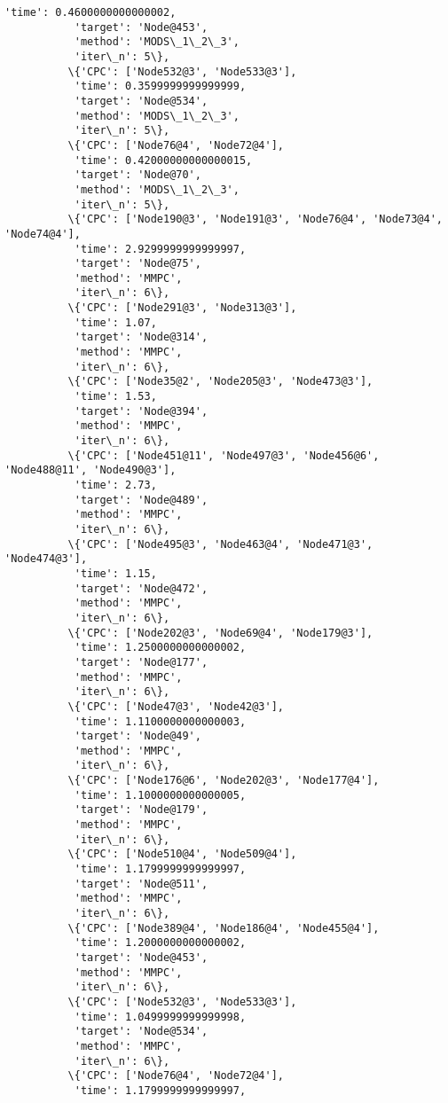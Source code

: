 \documentclass[11pt]{article}
\begin{document}
\begin{Verbatim}[commandchars=\\\{\}]
           'time': 0.4600000000000002,
           'target': 'Node@453',
           'method': 'MODS\_1\_2\_3',
           'iter\_n': 5\},
          \{'CPC': ['Node532@3', 'Node533@3'],
           'time': 0.3599999999999999,
           'target': 'Node@534',
           'method': 'MODS\_1\_2\_3',
           'iter\_n': 5\},
          \{'CPC': ['Node76@4', 'Node72@4'],
           'time': 0.42000000000000015,
           'target': 'Node@70',
           'method': 'MODS\_1\_2\_3',
           'iter\_n': 5\},
          \{'CPC': ['Node190@3', 'Node191@3', 'Node76@4', 'Node73@4', 'Node74@4'],
           'time': 2.9299999999999997,
           'target': 'Node@75',
           'method': 'MMPC',
           'iter\_n': 6\},
          \{'CPC': ['Node291@3', 'Node313@3'],
           'time': 1.07,
           'target': 'Node@314',
           'method': 'MMPC',
           'iter\_n': 6\},
          \{'CPC': ['Node35@2', 'Node205@3', 'Node473@3'],
           'time': 1.53,
           'target': 'Node@394',
           'method': 'MMPC',
           'iter\_n': 6\},
          \{'CPC': ['Node451@11', 'Node497@3', 'Node456@6', 'Node488@11', 'Node490@3'],
           'time': 2.73,
           'target': 'Node@489',
           'method': 'MMPC',
           'iter\_n': 6\},
          \{'CPC': ['Node495@3', 'Node463@4', 'Node471@3', 'Node474@3'],
           'time': 1.15,
           'target': 'Node@472',
           'method': 'MMPC',
           'iter\_n': 6\},
          \{'CPC': ['Node202@3', 'Node69@4', 'Node179@3'],
           'time': 1.2500000000000002,
           'target': 'Node@177',
           'method': 'MMPC',
           'iter\_n': 6\},
          \{'CPC': ['Node47@3', 'Node42@3'],
           'time': 1.1100000000000003,
           'target': 'Node@49',
           'method': 'MMPC',
           'iter\_n': 6\},
          \{'CPC': ['Node176@6', 'Node202@3', 'Node177@4'],
           'time': 1.1000000000000005,
           'target': 'Node@179',
           'method': 'MMPC',
           'iter\_n': 6\},
          \{'CPC': ['Node510@4', 'Node509@4'],
           'time': 1.1799999999999997,
           'target': 'Node@511',
           'method': 'MMPC',
           'iter\_n': 6\},
          \{'CPC': ['Node389@4', 'Node186@4', 'Node455@4'],
           'time': 1.2000000000000002,
           'target': 'Node@453',
           'method': 'MMPC',
           'iter\_n': 6\},
          \{'CPC': ['Node532@3', 'Node533@3'],
           'time': 1.0499999999999998,
           'target': 'Node@534',
           'method': 'MMPC',
           'iter\_n': 6\},
          \{'CPC': ['Node76@4', 'Node72@4'],
           'time': 1.1799999999999997,

\end{Verbatim}
\end{document}
